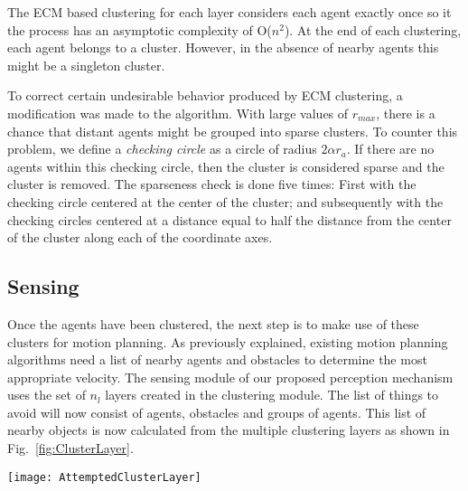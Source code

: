 The ECM based clustering for each layer considers each agent exactly once so it the process has an asymptotic complexity of O($n^2$). At the end of each clustering, each agent belongs to a cluster. However, in the absence of nearby agents this might be a singleton cluster.

To correct certain undesirable behavior produced by ECM clustering, a modification was made to the algorithm. With large values of $r_{max}$, there is a chance that distant agents might be grouped into sparse clusters. To counter this problem, we define a \emph{checking circle} as a circle of radius $2 \alpha r_{a}$. If there are no agents within this checking circle, then the cluster is considered sparse and the cluster is removed. The sparseness check is done five times: First with the checking circle centered at the center of the cluster; and subsequently with the checking circles centered at a distance equal to half the distance from the center of the cluster along each of the coordinate axes.

\subsection{Sensing}
\label{IBP:Sensing}

Once the agents have been clustered, the next step is to make use of these clusters for motion planning. As previously explained, existing motion planning algorithms need a list of nearby agents and obstacles to determine the most appropriate velocity. The sensing module of our proposed perception mechanism uses the set of $n_l$ layers created in the clustering module. The list of things to avoid will now consist of agents, obstacles and groups of agents. This list of nearby objects is now calculated from the multiple clustering layers as shown in Fig.~\ref{fig:ClusterLayer}.

\begin{figure*}[!t]
\centering
\texttt{[image: AttemptedClusterLayer]}
\caption[A Multi-layered Clustering Approach]{The figure illustrates how the opaque agent senses objects using 2 clustering layers. The bottom layer is the original environment and the two planes above show the two clustering layers. Clusters in layer 2 are generally bigger than in layer 1. Solid lined circles indicate the normal agents and the clustered agents. The dotted lines show the regions of perception. }
\label{fig:ClusterLayer}
\end{figure*}


